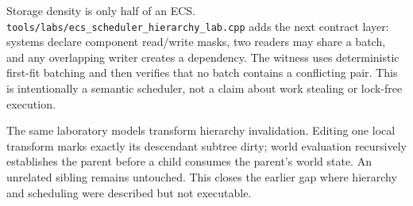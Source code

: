 Storage density is only half of an ECS. \texttt{tools/labs/ecs\_scheduler\_hierarchy\_lab.cpp} adds the next contract layer: systems declare component read/write masks, two readers may share a batch, and any overlapping writer creates a dependency. The witness uses deterministic first-fit batching and then verifies that no batch contains a conflicting pair. This is intentionally a semantic scheduler, not a claim about work stealing or lock-free execution.

The same laboratory models transform hierarchy invalidation. Editing one local transform marks exactly its descendant subtree dirty; world evaluation recursively establishes the parent before a child consumes the parent's world state. An unrelated sibling remains untouched. This closes the earlier gap where hierarchy and scheduling were described but not executable.

